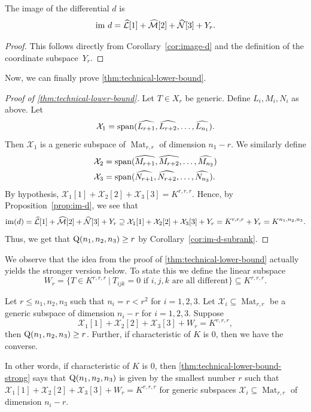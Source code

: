 \documentclass[11pt]{article}
\theoremstyle{definition}
\theoremstyle{remark}
\newcommand{\gensubrank}{{\rm Q}}
\newcommand{\spa}{{\rm span}}
\newcommand{\Mat}{\operatorname{Mat}}
\newcommand{\im}{{\rm im}}
\begin{document}
%


\begin{proposition} \label{prop:im-d}
The image of the differential $d$ is
$$
\im\ d = \mathcal{\widehat{L}}[1] + \mathcal{\widehat{M}}[2] + \mathcal{\widehat{N}}[3] + Y_r.
$$
\end{proposition}

\begin{proof}
This follows directly from Corollary~\ref{cor:image-d} and the definition of the coordinate subspace~$Y_r$.
\end{proof}


Now, we can finally prove \autoref{thm:technical-lower-bound}.

\begin{proof} [Proof of \autoref{thm:technical-lower-bound}]
Let $T \in X_r$ be generic. Define $L_i, M_i, N_i$ as above. Let
\[
\mathcal{X}_1 = \spa (\widehat{L_{r+1}}, \widehat{L_{r+2}}, \dots, \widehat{L_{n_1}}).
\]
Then $\mathcal{X}_1$ is a generic subspace of $\Mat_{r,r}$ of dimension $n_1 - r$. We similarly define 
\begin{align*}
\mathcal{X}_2 &= \spa (\widehat{M_{r+1}}, \widehat{M_{r+2}}, \dots, \widehat{M_{n_2}})\\
\mathcal{X}_3 &= \spa (\widehat{N_{r+1}}, \widehat{N_{r+2}}, \dots, \widehat{N_{n_3}}).
\end{align*}
By hypothesis, $\mathcal{X}_1[1] + \mathcal{X}_2[2] + \mathcal{X}_3[3] = K^{r,r,r}$. Hence, by Proposition~\ref{prop:im-d}, we see that 
\[
\im(d) = \mathcal{\widehat{L}}[1] + \mathcal{\widehat{M}}[2] + \mathcal{\widehat{N}}[3] + Y_r \supseteq \mathcal{X}_1[1] + \mathcal{X}_2[2] + \mathcal{X}_3[3] + Y_r = K^{r,r,r} + Y_r = K^{n_1,n_2,n_3}.
\]
Thus, we get that $\gensubrank(n_1,n_2,n_3) \geq r$  by Corollary~\ref{cor:im-d-subrank}.
\end{proof}

%
%

%

%

We observe that the idea from the proof of \autoref{thm:technical-lower-bound} actually yields the stronger version below. To state this we define the linear subspace
\[
W_r =  \{T \in K^{r,r,r} \ | \ T_{ijk} = 0 \text{ if  $i,j,k$ are all different} \} \subseteq K^{r,r,r}.
\]\par
\begin{theorem}\label{thm:technical-lower-bound-strong}
Let $r \leq n_1,n_2,n_3$ such that $n_i = r < r^2$ for $i = 1,2,3$. Let $\mathcal{X}_i \subseteq \Mat_{r,r}$ be a generic subspace of dimension $n_i - r$ for $i = 1,2,3$. Suppose 
$$
\mathcal{X}_1[1] + \mathcal{X}_2[2] + \mathcal{X}_3[3] + W_r = K^{r,r,r},
$$
then $\gensubrank(n_1,n_2,n_3) \geq r$.
Further, if characteristic of $K$ is $0$, then we have the converse.
\end{theorem}
In other words, if characteristic of $K$ is $0$, then \autoref{thm:technical-lower-bound-strong} says that $\gensubrank(n_1,n_2,n_3)$ is given by the smallest number $r$ such that 
%
%
$\mathcal{X}_1[1] + \mathcal{X}_2[2] + \mathcal{X}_3[3] + W_r = K^{r,r,r}$ for generic subspaces $\mathcal{X}_i \subseteq \Mat_{r,r}$ of dimension $n_i -r$.
%
%
\end{document}
